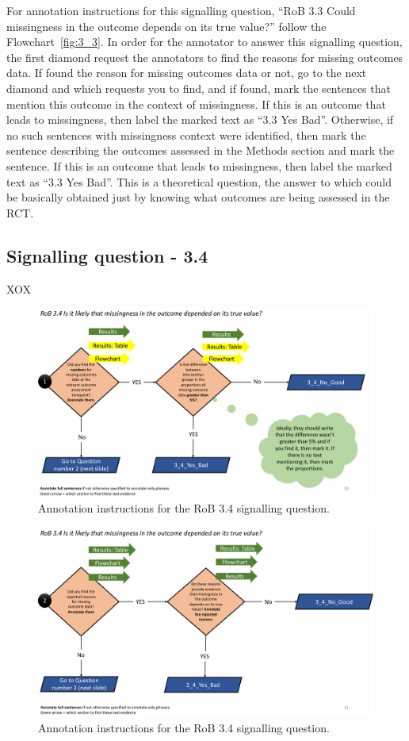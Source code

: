 \documentclass[sn-mathphys,Numbered]{sn-jnl}%
\begin{document}
For annotation instructions for this signalling question, ``RoB 3.3 Could missingness in the outcome depends on its true value?'' follow the Flowchart~\ref{fig:3_3}.
In order for the annotator to answer this signalling question, the first diamond request the annotators to find the reasons for missing outcomes data.
If found the reason for missing outcomes data or not, go to the next diamond and which requests you to find, and if found, mark the sentences that mention this outcome in the context of missingness.
If this is an outcome that leads to missingness, then label the marked text as ``3.3 Yes Bad''.
Otherwise, if no such sentences with missingness context were identified, then mark the sentence describing the outcomes assessed in the Methods section and mark the sentence.
If this is an outcome that leads to missingness, then label the marked text as ``3.3 Yes Bad''.
This is a theoretical question, the answer to which could be basically obtained just by knowing what outcomes are being assessed in the RCT.
%
%
%
\subsection*{Signalling question - 3.4 }
%
XOX

\begin{figure}[hbt]
    \centering
    \includegraphics[width=\textwidth]{figures/3_4_1.pdf}
    \caption{Annotation instructions for the RoB 3.4 signalling question.}
    \label{fig:3_4_1}
\end{figure}


\begin{figure}[hbt]
    \centering
    \includegraphics[width=\textwidth]{figures/3_4_2.pdf}
    \caption{Annotation instructions for the RoB 3.4 signalling question.}
    \label{fig:3_4_2}
\end{figure}
\end{document}
